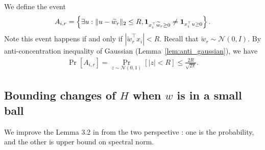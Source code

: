 \documentclass[11pt]{article}
\newcommand{\N}{\mathcal{N}}
\newcommand{\wt}{\widetilde}
\begin{document}
We define the event
\begin{align*}
A_{i,r} = \left\{ \exists u : \| u - \wt{w}_r \|_2 \leq R, {\bf 1}_{ x_i^\top \wt{w}_r \geq 0 } \neq {\bf 1}_{ x_i^\top u \geq 0 } \right\}.
\end{align*}
Note this event happens if and only if $| \wt{w}_r^\top x_i | < R$. Recall that $\wt{w}_r \sim \N(0,I)$. By anti-concentration inequality of Gaussian (Lemma~\ref{lem:anti_gaussian}), we have
\begin{align}\label{eq:Air_bound}
\Pr[ A_{i,r} ] = \Pr_{ z \sim \N(0,1) } [ | z | < R ] \leq \frac{ 2 R }{ \sqrt{2\pi} }.
\end{align}


\subsection{Bounding changes of $H$ when $w$ is in a small ball}
We improve the Lemma 3.2 in \cite{dzps19} from the two perspective : one is the probability, and the other is upper bound on spectral norm.
\end{document}
